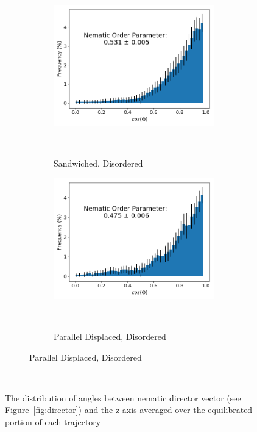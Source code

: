 \documentclass{article}
\begin{document}
\begin{figure}[!htb]
\begin{subfigure}{\linewidth}
\begin{subfigure}{0.45\linewidth}
        \end{subfigure}
        \begin{subfigure}{0.45\linewidth}
                \centering
                \includegraphics[width=\linewidth]{disorder_sandwich_nematic_order.png}
                \caption{Sandwiched, Disordered}~\label{fig:disorder_sandwich_nematic}
        \end{subfigure}%
        \begin{subfigure}{0.45\linewidth}
                \centering
                \includegraphics[width=\linewidth]{disorder_offset_nematic_order.png}
                \caption{Parallel Displaced, Disordered}~\label{fig:disorder_offset_nematic}
        \end{subfigure}
  \end{subfigure}
  \caption{The distribution of angles between nematic director vector (see
	  Figure~\ref{fig:director}) and the z-axis averaged over the equilibrated portion
	  of each trajectory}~\label{fig:nematic_distribution}
  \end{figure}
\end{document}
